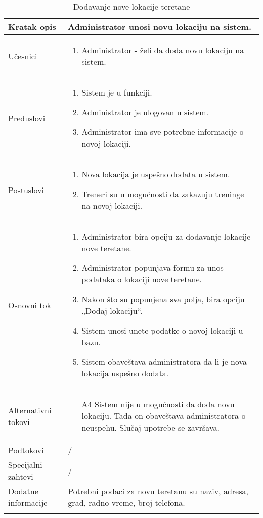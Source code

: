 \documentclass[../main.tex]{subfiles}
\begin{document}
\begin{longtable}{| p{} | p{} |} 

\hline
    Kratak opis &  Administrator unosi novu lokaciju na sistem.\\ 
\hline    
    Učesnici & 
    	\begin{enumerate}
        \item Administrator - želi da doda novu lokaciju na sistem.
     \end{enumerate}\\
\hline
   Preduslovi & \begin{enumerate}
       \item Sistem je u funkciji.
       \item Administrator je ulogovan u sistem.
       \item Administrator ima sve potrebne informacije o novoj lokaciji.
   \end{enumerate}\\
\hline  
    Postuslovi & \begin{enumerate}
        \item Nova lokacija je uspešno dodata u sistem.
        \item Treneri su u mogućnosti da zakazuju treninge na novoj lokaciji.
    \end{enumerate}\\
\hline
    Osnovni tok & \begin{enumerate}
        \item Administrator bira opciju za dodavanje lokacije nove teretane.
        \item Administrator popunjava formu za unos podataka o lokaciji nove teretane.
        \item Nakon što su popunjena sva polja, bira opciju „Dodaj lokaciju“.
        \item Sistem unosi unete podatke o novoj lokaciji u bazu.
        \item Sistem obaveštava administratora da li je nova lokacija uspešno dodata.
    \end{enumerate}\\
\hline
    Alternativni tokovi & \begin{itemize}
        \item[A4]  Sistem nije u mogućnosti da doda novu lokaciju. Tada on obaveštava administratora o neuspehu. Slučaj upotrebe se završava.

    \end{itemize}\\
\hline
    Podtokovi & /\\
\hline
    Specijalni zahtevi & /\\
\hline
    Dodatne informacije & Potrebni podaci za novu teretanu su naziv, adresa, grad, radno vreme, broj telefona.\\
\hline
\caption{Dodavanje nove lokacije teretane} %
\end{longtable}
\end{document}
